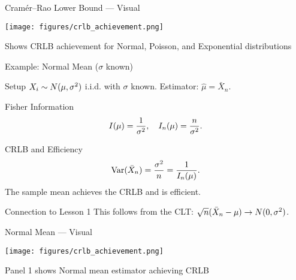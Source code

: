 \begin{frame}{Cramér--Rao Lower Bound --- Visual}
  \begin{center}
    \texttt{[image: figures/crlb\_achievement.png]}
  \end{center}
  \vspace{-0.3cm}
  \footnotesize Shows CRLB achievement for Normal, Poisson, and Exponential distributions
\end{frame}

\begin{frame}{Example: Normal Mean ($\sigma$ known)}
  \begin{block}{Setup}
    $X_i \sim N(\mu, \sigma^2)$ i.i.d. with $\sigma$ known.
    Estimator: $\hat{\mu} = \bar{X}_n$.
  \end{block}

  \begin{block}{Fisher Information}
    \[I(\mu) = \frac{1}{\sigma^2}, \quad I_n(\mu) = \frac{n}{\sigma^2}.\]
  \end{block}

  \begin{block}{CRLB and Efficiency}
    \[\operatorname{Var}(\bar{X}_n) = \frac{\sigma^2}{n} = \frac{1}{I_n(\mu)}.\]
    The sample mean achieves the CRLB and is efficient.
  \end{block}

  \begin{block}{Connection to Lesson 1}
    This follows from the CLT: $\sqrt{n}(\bar{X}_n - \mu) \to N(0, \sigma^2)$.
  \end{block}
\end{frame}

\begin{frame}{Normal Mean --- Visual}
  \begin{center}
    \texttt{[image: figures/crlb\_achievement.png]}
  \end{center}
  \vspace{-0.3cm}
  \footnotesize Panel 1 shows Normal mean estimator achieving CRLB
\end{frame}

